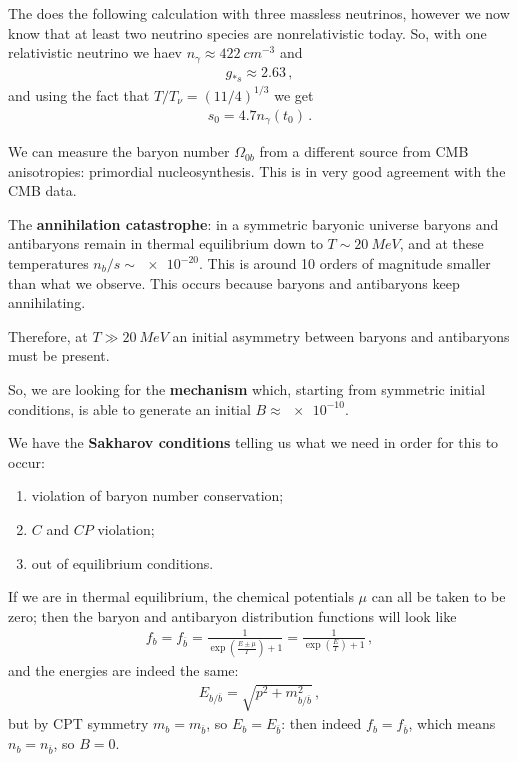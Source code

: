 \documentclass[main.tex]{subfiles}
\begin{document}
The \textcite{kolbEarlyUniverse1994} does the following calculation with three massless neutrinos, however we now know that at least two neutrino species are nonrelativistic today. 
So, with one relativistic neutrino we haev \(n_\gamma \approx \SI{422}{cm^{-3}}\) and 
%
\begin{align}
g_{*s} \approx \num{2.63}
\,,
\end{align}
%
and using the fact that \( T / T_\nu = (11/4)^{1/3}\) we get 
%
\begin{align}
s_0 = \num{4.7} n_\gamma (t_0 )
\,.
\end{align}

We can measure the baryon number \(\Omega_{0b}\) from a different source from CMB anisotropies: primordial nucleosynthesis. 
This is in very good agreement with the CMB data. 

The \textbf{annihilation catastrophe}: in a symmetric baryonic universe baryons and antibaryons remain in thermal equilibrium down to \(T \sim \SI{20}{MeV}\), and at these temperatures \(n_b / s \sim \num{e-20}\). 
This is around 10 orders of magnitude smaller than what we observe. 
This occurs because baryons and antibaryons keep annihilating. 

Therefore, at \(T \gg \SI{20}{MeV}\) an initial asymmetry between baryons and antibaryons must be present. 

So, we are looking for the \textbf{mechanism} which, starting from symmetric initial conditions, is able to generate an initial \(B \approx \num{e-10}\).

We have the \textbf{Sakharov conditions} telling us what we need in order for this to occur: 
\begin{enumerate}
    \item violation of baryon number conservation;
    \item \(C\) and \(CP\) violation;
    \item out of equilibrium conditions.
\end{enumerate}

If we are in thermal equilibrium, the chemical potentials \(\mu \) can all be taken to be zero; then the baryon and antibaryon distribution functions will look like 
%
\begin{align}
f_b = f_{\overline{b}} = \frac{1}{\exp(\frac{E \pm \mu }{T}) + 1} = \frac{1}{\exp(\frac{E}{T}) + 1}
\,,
\end{align}
%
and the energies are indeed the same: 
%
\begin{align}
E_{b / \overline{b}} = \sqrt{p^2 + m_{b / \overline{b}}^2}
\,,
\end{align}
%
but by CPT symmetry \(m_b = m_{\overline{b}}\), so \(E_b = E_{\overline{b}}\): then indeed \(f_b = f_{\overline{b}}\), which means \(n_b = n_{\overline{b}}\), so \(B = 0\).
\end{document}
